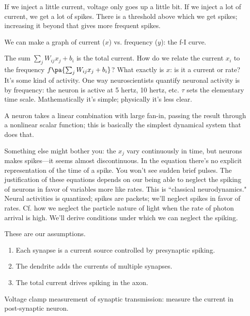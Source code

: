 If we inject a little current, voltage only goes up a little bit. If we inject a lot of current, we get a lot of spikes. There is a threshold above which we get spikes; increasing it beyond that gives more frequent spikes.

We can make a graph of current ($x$) vs. frequency ($y$): the f-I curve.

The sum $\sum_j W_{ij}x_j +b_i$ is the total current.
How do we relate the current $x_i$ to the frequency $f\pa{\sum_j W_{ij}x_j +b_i}$?
What exactly is $x$: is it a current or rate? It's some kind of activity. 
One way neuroscientists quantify neuronal activity is by frequency: the neuron is active at 5 hertz, 10 hertz, etc.  $\tau$ sets the elementary time scale. Mathematically it's simple; physically it's less clear.

A neuron takes a linear combination with large fan-in, passing the result through a nonlinear scalar function; this is basically the simplest dynamical system that does that.

Something else might bother you: the $x_j$ vary continuously in time, but neurons makes spikes---it seems almost discontinuous. In the equation there's no explicit representation of the time of a spike. You won't see sudden brief pulses. The justification of these equations depends on our being able to neglect the spiking of neurons in favor of variables more like rates. This is ``classical neurodynamics." Neural activities is quantized; spikes are packets; we'll neglect spikes in favor of rates. Cf. how we neglect the particle nature of light when the rate of photon arrival is high. We'll derive conditions under which we can neglect the spiking.

These are our assumptions.
\begin{enumerate}
\item
Each synapse is a current source controlled by presynaptic spiking.
\item 
The dendrite adds the currents of multiple synapses.
\item 
The total current drives spiking in the axon.
\end{enumerate}

Voltage clamp measurement of synaptic transmission: measure the current in post-synaptic neuron.

